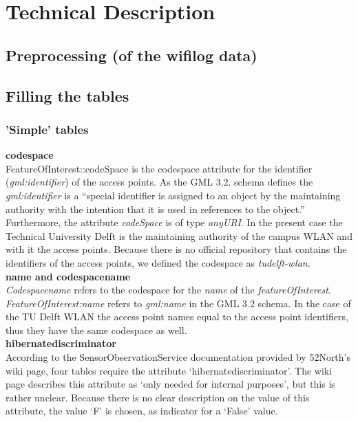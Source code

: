 \chapter{Technical Description}

\section{Preprocessing (of the wifilog data)}

\section{Filling the tables}

\subsection{'Simple' tables}
\textbf{codespace}\\
FeatureOfInterest::codeSpace is the codespace attribute for the identifier (\textit{gml:identifier}) of the access points. As the GML 3.2. schema defines the \textit{gml:identifier} is a “special identifier is assigned to an object by the maintaining authority with the intention that it is used in references to the object.” Furthermore, the attribute \textit{codeSpace} is of type \textit{anyURI}. In the present case the Technical University Delft is the maintaining authority of the campus WLAN and with it the access points. Because there is no official repository that contains the identifiers of the access points, we defined the codespace as \textit{tudelft-wlan}.\\

\textbf{name and codespacename}\\
\textit{Codespacename} refers to the codespace for the \textit{name} of the \textit{featureOfInterest}. \textit{FeatureOfInterest:name} refers to \textit{gml:name} in the GML 3.2 schema. In the case of the TU Delft WLAN the access point names equal to the access point identifiers, thus they have the same codespace as well.\\

\textbf{hibernatediscriminator}\\
According to the SensorObservationService documentation provided by 52North’s wiki page, four tables require the attribute ‘hibernatediscriminator’. The wiki page describes this attribute as ‘only needed for internal purposes’, but this is rather unclear. Because there is no clear description on the value of this attribute, the value ‘F’ is chosen, as indicator for a ‘False’ value.

